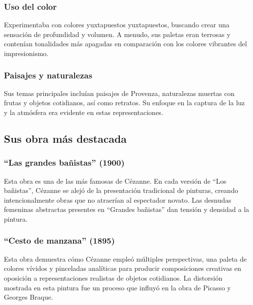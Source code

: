 \documentclass{article}
\begin{document}
\subsubsection{Uso del color}
Experimentaba con colores yuxtapuestos yuxtapuestos, buscando crear una sensación de profundidad y volumen. 
A menudo, sus paletas eran terrosas y contenían tonalidades más apagadas en comparación con los colores vibrantes del impresionismo.

\subsubsection{Paisajes y naturalezas}
Sus temas principales incluían paisajes de Provenza, naturalezas muertas con frutas y objetos cotidianos, así como retratos. 
Su enfoque en la captura de la luz y la atmósfera era evidente en estas representaciones.

\subsection{Sus obra más destacada}
\subsubsection{``Las grandes bañistas'' (1900)}
Esta obra es una de las más famosas de Cézanne. En cada versión de “Los bañistas”, Cézanne se alejó de la presentación tradicional de pinturas, 
creando intencionalmente obras que no atraerían al espectador novato. Las desnudas femeninas abstractas presentes en “Grandes bañistas” dan tensión y densidad a la pintura.


\subsubsection{``Cesto de manzana'' (1895)}
Esta obra demuestra cómo Cézanne empleó múltiples perspectivas, una paleta de colores vívidos y pinceladas analíticas para producir composiciones creativas en oposición a 
representaciones realistas de objetos cotidianos. La distorsión mostrada en esta pintura fue un proceso que influyó en la obra de Picasso y Georges Braque.
\end{document}
